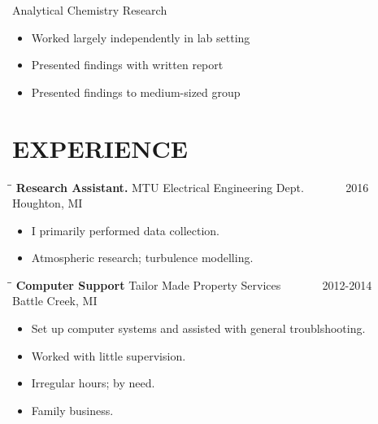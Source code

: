 \documentclass[letterpaper]{res}
\begin{document}
\begin{resume}
        Analytical Chemistry Research
        \begin{itemize} \itemsep1pt \parskip0pt 
                \item Worked largely independently in lab setting
                \item Presented findings with written report
                \item Presented findings to medium-sized group
        \end{itemize}

\section{EXPERIENCE}
   \vspace{-0.15in}
   \begin{tabbing}
   \hspace{2.3in}\= \hspace{2.6in}\= \kill %
   {\bf Research Assistant.} \>MTU Electrical Engineering Dept. \> ~~~~~~ 2016\\
                          \>Houghton, MI
   \end{tabbing}\vspace{-10pt}
   \begin{itemize} \itemsep1pt \parskip0pt 
   \item I primarily performed data collection.
   \item Atmospheric research; turbulence modelling.
   \end{itemize}

   \vspace{-0.15in}
   \begin{tabbing}
   \hspace{2.3in}\= \hspace{2.6in}\= \kill %
    {\bf Computer Support} \>Tailor Made Property Services \> ~~~~~~ 2012-2014\\
                          \>Battle Creek, MI
   \end{tabbing}\vspace{-10pt}
   \begin{itemize} \itemsep1pt \parskip0pt 
   \item Set up computer systems and assisted with general troublshooting.
   \item Worked with little supervision.
   \item Irregular hours; by need.
   \item Family business.
   \end{itemize}


\end{resume}
\end{document}
